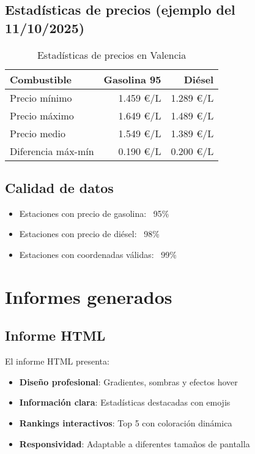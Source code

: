 \subsection{Estadísticas de precios (ejemplo del 11/10/2025)}

\begin{table}[H]
  \centering
  \begin{tabular}{@{}lrr@{}}
    \toprule
    \textbf{Combustible} & \textbf{Gasolina 95} & \textbf{Diésel} \\ \midrule
    Precio mínimo        & 1.459 €/L            & 1.289 €/L       \\
    Precio máximo        & 1.649 €/L            & 1.489 €/L       \\
    Precio medio         & 1.549 €/L            & 1.389 €/L       \\
    Diferencia máx-mín   & 0.190 €/L            & 0.200 €/L       \\ \bottomrule
  \end{tabular}
  \caption{Estadísticas de precios en Valencia}
  \label{tab:precios}
\end{table}

\subsection{Calidad de datos}

\begin{itemize}
  \item Estaciones con precio de gasolina: ~95\%
  \item Estaciones con precio de diésel: ~98\%
  \item Estaciones con coordenadas válidas: ~99\%
\end{itemize}

\section{Informes generados}

\subsection{Informe HTML}

El informe HTML presenta:

\begin{itemize}
  \item \textbf{Diseño profesional}: Gradientes, sombras y efectos hover
  \item \textbf{Información clara}: Estadísticas destacadas con emojis
  \item \textbf{Rankings interactivos}: Top 5 con coloración dinámica
  \item \textbf{Responsividad}: Adaptable a diferentes tamaños de pantalla
\end{itemize}


